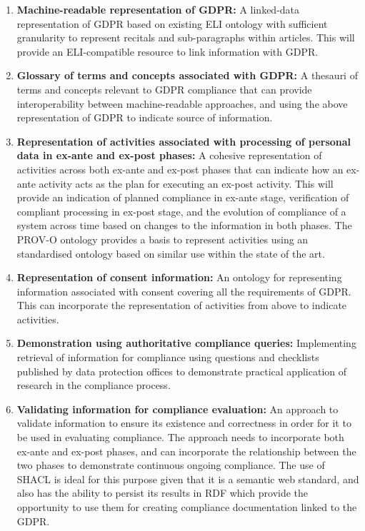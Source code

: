 \begin{enumerate}
\item \textbf{Machine-readable representation of GDPR:} A linked-data representation of GDPR based on existing ELI ontology with sufficient granularity to represent recitals and sub-paragraphs within articles. This will provide an ELI-compatible resource to link information with GDPR.
\item \textbf{Glossary of terms and concepts associated with GDPR:} A thesauri of terms and concepts relevant to GDPR compliance that can provide interoperability between machine-readable approaches, and using the above representation of GDPR to indicate source of information.
\item \textbf{Representation of activities associated with processing of personal data in ex-ante and ex-post phases:} A cohesive representation of activities across both ex-ante and ex-post phases that can indicate how an ex-ante activity acts as the plan for executing an ex-post activity. This will provide an indication of planned compliance in ex-ante stage, verification of compliant processing in ex-post stage, and the evolution of compliance of a system across time based on changes to the information in both phases. The PROV-O ontology provides a basis to represent activities using an standardised ontology based on similar use within the state of the art.
\item \textbf{Representation of consent information:} An ontology for representing information associated with consent covering all the requirements of GDPR. This can incorporate the representation of activities from above to indicate activities.
\item \textbf{Demonstration using authoritative compliance queries:} Implementing retrieval of information for compliance using questions and checklists published by data protection offices to demonstrate practical application of research in the compliance process.
\item \textbf{Validating information for compliance evaluation:} An approach to validate information to ensure its existence and correctness in order for it to be used in evaluating compliance. The approach needs to incorporate both ex-ante and ex-post phases, and can incorporate the relationship between the two phases to demonstrate continuous ongoing compliance. The use of SHACL is ideal for this purpose given that it is a semantic web standard, and also has the ability to persist its results in RDF which provide the opportunity to use them for creating compliance documentation linked to the GDPR.
\end{enumerate}
